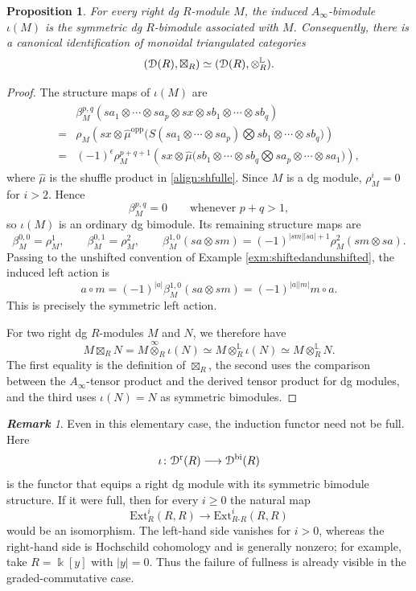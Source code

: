 \documentclass[a4paper, 11pt]{amsart}
\newtheorem{prop}[thm]{Proposition}
\theoremstyle{definition}
\theoremstyle{remark}
\newtheorem{rem}[thm]{\bf Remark}
\numberwithin{equation}{section}
\newcommand{\Ext}{\mathrm{Ext}}
\newcommand{\RR}{\mathrm{r}}
\newcommand{\BB}{\mathrm{bi}}
\newcommand{\opp}{\mathrm{opp}}
\newcommand{\ED}{\EuScript{D}}
\begin{document}
\begin{prop}\label{prop:commuativeiota}
For every right dg $R$-module $M$, the induced $A_\infty$-bimodule $\iota(M)$ is the symmetric dg $R$-bimodule associated with $M$. Consequently, there is a canonical identification of monoidal triangulated categories
\[
(\ED(R),\boxtimes_R)\simeq(\ED(R),\otimes_R^{\mathbb L}).
\]
\end{prop}
\begin{proof}
The structure maps of $\iota(M)$ are
\begin{align}\label{align:betapqcommutative}
\begin{aligned}
&\beta_M^{p,q}(sa_1\otimes\cdots\otimes sa_p\otimes sx\otimes sb_1\otimes\cdots\otimes sb_q)\\
={}&\rho_M\left(
sx\otimes
\widehat\mu^{\opp}
\bigl(S(sa_1\otimes\cdots\otimes sa_p)\bigotimes
sb_1\otimes\cdots\otimes sb_q\bigr)
\right)\\
={}&(-1)^\epsilon
\rho_M^{p+q+1}\left(
sx\otimes
\widehat\mu
\bigl(sb_1\otimes\cdots\otimes sb_q\bigotimes
sa_p\otimes\cdots\otimes sa_1\bigr)
\right),
\end{aligned}
\end{align}
where $\widehat\mu$ is the shuffle product in \eqref{align:shfulle}. Since $M$ is a dg module, $\rho_M^i=0$ for $i>2$. Hence
\[
\beta_M^{p,q}=0
\qquad\text{whenever }p+q>1,
\]
so $\iota(M)$ is an ordinary dg bimodule. Its remaining structure maps are
\[
\beta_M^{0,0}=\rho_M^1,
\qquad
\beta_M^{0,1}=\rho_M^2,
\qquad
\beta_M^{1,0}(sa\otimes sm)
 =(-1)^{|sm||sa|+1}\rho_M^2(sm\otimes sa).
\]
Passing to the unshifted convention of Example \ref{exm:shiftedandunshifted}, the induced left action is
\[
a\circ m
 =(-1)^{|a|}\beta_M^{1,0}(sa\otimes sm)
 =(-1)^{|a||m|}m\circ a.
\]
This is precisely the symmetric left action.

For two right dg $R$-modules $M$ and $N$, we therefore have
\[
M\boxtimes_R N
 =M\overset{\infty}{\otimes}_R\iota(N)
 \simeq M\otimes_R^{\mathbb L}\iota(N)
 \simeq M\otimes_R^{\mathbb L}N.
\]
The first equality is the definition of $\boxtimes_R$, the second uses the comparison between the $A_\infty$-tensor product and the derived tensor product for dg modules, and the third uses $\iota(N)=N$ as symmetric bimodules.
\end{proof}

\begin{rem}\label{rem:iotanotful}
Even in this elementary case, the induction functor need not be full. Here
\[
\iota\colon\ED^{\RR}(R)\longrightarrow\ED^{\BB}(R)
\]
is the functor that equips a right dg module with its symmetric bimodule structure. If it were full, then for every $i\geq0$ the natural map
\[
\Ext_R^i(R,R)\longrightarrow\Ext_{R\text{-}R}^i(R,R)
\]
would be an isomorphism. The left-hand side vanishes for $i>0$, whereas the right-hand side is Hochschild cohomology and is generally nonzero; for example, take $R=\Bbbk[y]$ with $|y|=0$. Thus the failure of fullness is already visible in the graded-commutative case.
\end{rem}
\end{document}
